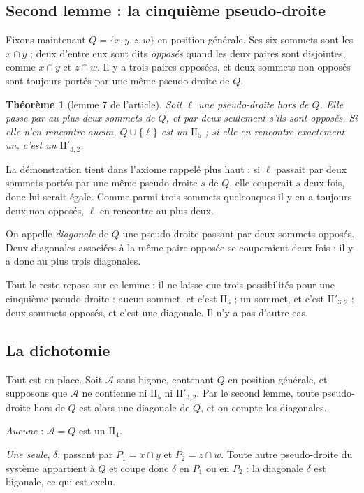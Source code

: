 \documentclass[11pt,a4paper]{amsart}
\theoremstyle{definition}
\theoremstyle{plain}
\newtheorem{theoreme}{Théorème}
\theoremstyle{remark}
\newcommand{\II}[1]{\mathrm{II}_{#1}}
\newcommand{\IIp}{\mathrm{II}'_{3,2}}
\newcommand{\A}{\mathcal A}
\begin{document}
\subsection{Second lemme : la cinquième pseudo-droite}

Fixons maintenant $Q = \{x, y, z, w\}$ en position générale. Ses six sommets sont les $x \cap y$ ; deux d'entre eux sont dits \emph{opposés} quand les deux paires sont disjointes, comme $x \cap y$ et $z \cap w$. Il y a trois paires opposées, et deux sommets non opposés sont toujours portés par une même pseudo-droite de $Q$.

\begin{theoreme}[lemme 7 de l'article]
Soit $\ell$ une pseudo-droite hors de $Q$. Elle passe par au plus deux sommets de $Q$, et par deux seulement s'ils sont opposés. Si elle n'en rencontre aucun, $Q \cup \{\ell\}$ est un $\II5$ ; si elle en rencontre exactement un, c'est un $\IIp$.
\end{theoreme}

La démonstration tient dans l'axiome rappelé plus haut : si $\ell$ passait par deux sommets portés par une même pseudo-droite $s$ de $Q$, elle couperait $s$ deux fois, donc lui serait égale. Comme parmi trois sommets quelconques il y en a toujours deux non opposés, $\ell$ en rencontre au plus deux.

On appelle \emph{diagonale} de $Q$ une pseudo-droite passant par deux sommets opposés. Deux diagonales associées à la même paire opposée se couperaient deux fois : il y a donc au plus trois diagonales.

Tout le reste repose sur ce lemme : il ne laisse que trois possibilités pour une cinquième pseudo-droite : aucun sommet, et c'est $\II5$ ; un sommet, et c'est $\IIp$ ; deux sommets opposés, et c'est une diagonale. Il n'y a pas d'autre cas.

\subsection{La dichotomie}

Tout est en place. Soit $\A$ sans bigone, contenant $Q$ en position générale, et supposons que $\A$ ne contienne ni $\II5$ ni $\IIp$. Par le second lemme, toute pseudo-droite hors de $Q$ est alors une diagonale de $Q$, et on compte les diagonales.

\emph{Aucune} : $\A = Q$ est un $\II4$.

\emph{Une seule}, $\delta$, passant par $P_1 = x \cap y$ et $P_2 = z \cap w$. Toute autre pseudo-droite du système appartient à $Q$ et coupe donc $\delta$ en $P_1$ ou en $P_2$ : la diagonale $\delta$ est bigonale, ce qui est exclu.
\end{document}
